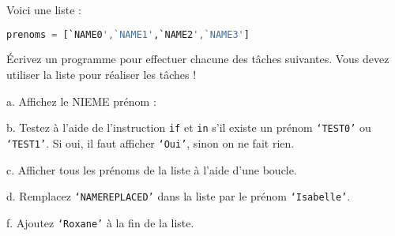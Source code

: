 \documentclass[12pt]{exam}
\begin{document}
\begin{questions}
\question[11] Voici une liste :
\begin{lstlisting}[language=Python]
prenoms = [`NAME0',`NAME1',`NAME2',`NAME3']
\end{lstlisting}
Écrivez un programme pour effectuer chacune des tâches suivantes. Vous devez utiliser la liste pour réaliser les tâches !

a. Affichez le NIEME prénom :
\fillwithgrid{12mm}

b. Testez à l’aide de l’instruction \texttt{if} et \texttt{in} s’il existe un prénom \texttt{`TEST0'} ou \texttt{`TEST1'}. Si oui, il faut afficher \texttt{`Oui'}, sinon on ne fait rien.
\fillwithgrid{12mm}

c. Afficher tous les prénoms de la liste à l’aide d’une boucle.
\fillwithgrid{12mm}

d. Remplacez \texttt{`NAMEREPLACED'} dans la liste par le prénom \texttt{`Isabelle'}.
\fillwithgrid{12mm}

f. Ajoutez \texttt{`Roxane'} à la fin de la liste.
\fillwithgrid{12mm}

\end{questions}
\end{document}
